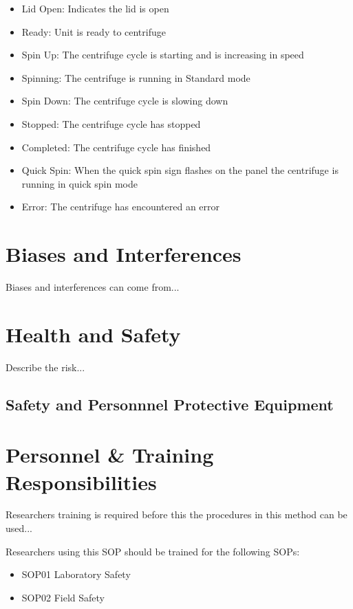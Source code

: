 \documentclass[12pt]{../SOP3_beta}
\begin{document}
\begin{itemize}
  \item Lid Open: Indicates the lid is open
  \item Ready: Unit is ready to centrifuge 
  \item Spin Up: The centrifuge cycle is starting and is increasing in speed
  \item Spinning: The centrifuge is running in Standard mode 
  \item Spin Down: The centrifuge cycle is slowing down
  \item Stopped: The centrifuge cycle has stopped
  \item Completed: The centrifuge cycle has finished
  \item Quick Spin: When the quick spin sign flashes on the panel the centrifuge is running in quick spin mode
  \item Error: The centrifuge has encountered an error
\end{itemize}

\section{Biases and Interferences}

\NP Biases and interferences can come from...

\section{Health and Safety}

\NP Describe the risk...


\subsection*{Safety and Personnnel Protective Equipment}


\section{Personnel \& Training Responsibilities}

\NP Researchers training is required before this the procedures in this method can be used... 

\NP Researchers using this SOP should be trained for the following SOPs:

\begin{itemize}
  \item SOP01 Laboratory Safety
  \item SOP02 Field Safety
\end{itemize}
\end{document}
